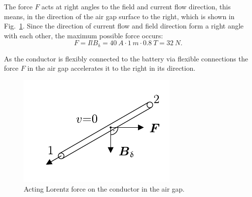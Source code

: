 \begin{solutionblock}
    The force $F$ acts at right angles to the field and current flow direction, this means, in the direction of the air gap surface to the right, which is shown in Fig.~\ref{fig:solution_LorentzForce}. Since the direction of current flow and field direction form a right angle with each other, the maximum possible force occurs:
    \begin{equation}
        F = I l B_{\mathrm{\updelta}}
        = 40 \ \si{A} \cdot 1 \ \si{m} \cdot 0.8 \ \si{T}
        = 32 \ \si{N}.
    \end{equation}
    
    As the conductor is flexibly connected to the battery via flexible connections the force $F$ in the air gap accelerates it to the right in its direction.

    \begin{figure}[ht]
        \centering
        \includegraphics{fig/ex01/solution_LorentzForce.pdf}
        \caption{Acting Lorentz force on the conductor in the air gap.}
        \label{fig:solution_LorentzForce}
    \end{figure}

\end{solutionblock}





